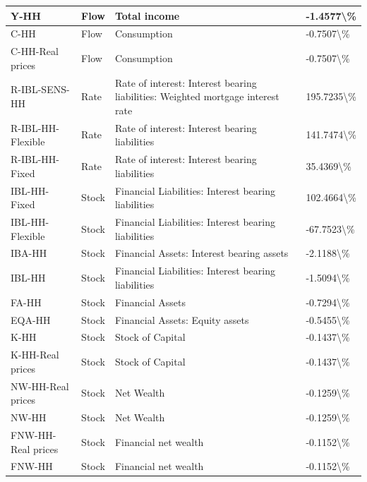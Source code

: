\documentclass[
]{book}
\begin{document}
\begin{table}
\begin{tabular}[t]{l|l|l|l}
\hline
Y-HH & Flow & Total income & -1.4577\textbackslash{}\%\\
\hline
C-HH & Flow & Consumption & -0.7507\textbackslash{}\%\\
\hline
C-HH-Real prices & Flow & Consumption & -0.7507\textbackslash{}\%\\
\hline
R-IBL-SENS-HH & Rate & Rate of interest: Interest bearing liabilities: Weighted mortgage interest rate & 195.7235\textbackslash{}\%\\
\hline
R-IBL-HH-Flexible & Rate & Rate of interest: Interest bearing liabilities & 141.7474\textbackslash{}\%\\
\hline
R-IBL-HH-Fixed & Rate & Rate of interest: Interest bearing liabilities & 35.4369\textbackslash{}\%\\
\hline
IBL-HH-Fixed & Stock & Financial Liabilities: Interest bearing liabilities & 102.4664\textbackslash{}\%\\
\hline
IBL-HH-Flexible & Stock & Financial Liabilities: Interest bearing liabilities & -67.7523\textbackslash{}\%\\
\hline
IBA-HH & Stock & Financial Assets: Interest bearing assets & -2.1188\textbackslash{}\%\\
\hline
IBL-HH & Stock & Financial Liabilities: Interest bearing liabilities & -1.5094\textbackslash{}\%\\
\hline
FA-HH & Stock & Financial Assets & -0.7294\textbackslash{}\%\\
\hline
EQA-HH & Stock & Financial Assets: Equity assets & -0.5455\textbackslash{}\%\\
\hline
K-HH & Stock & Stock of Capital & -0.1437\textbackslash{}\%\\
\hline
K-HH-Real prices & Stock & Stock of Capital & -0.1437\textbackslash{}\%\\
\hline
NW-HH-Real prices & Stock & Net Wealth & -0.1259\textbackslash{}\%\\
\hline
NW-HH & Stock & Net Wealth & -0.1259\textbackslash{}\%\\
\hline
FNW-HH-Real prices & Stock & Financial net wealth & -0.1152\textbackslash{}\%\\
\hline
FNW-HH & Stock & Financial net wealth & -0.1152\textbackslash{}\%\\
\hline
\end{tabular}
\end{table}
\end{document}
